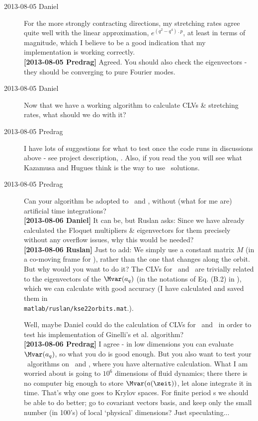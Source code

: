 \begin{description}
\item[2013-08-05 Daniel]
For the more strongly contracting directions, my stretching rates agree
quite well with the linear approximation, $e^{(q^2-q^4)\period{p}}$, at least
in terms of magnitude, which I believe to be a good indication that my
implementation is working correctly.
\\
{\bf [2013-08-05 Predrag]} Agreed. You should also check the eigenvectors - they
should be converging to pure Fourier modes.

\item[2013-08-05 Daniel]
Now that we have a working algorithm to calculate CLVs \& stretching
rates, what should we do with it?

\item[2013-08-05 Predrag] I have lots of suggestions for what to test
once the code runs in discussions above - see project description,
. Also, if you read the  you will
see what Kazamusa and Hugues think is the way to use \po\ solutions.

\item[2013-08-05 Predrag] Can your algorithm be adopted to
\eqva\ and \reqva, without (what for me are) artificial time integrations?
\\
{\bf [2013-08-06 Daniel]} It can be, but Ruslan asks: Since we have
already calculated the Floquet multipliers \& eigenvectors for them
precisely without any overflow issues, why this would be needed?
\\
{\bf [2013-08-06 Ruslan]} Just to add: We simply use a constant matrix
$M$ (in a co-moving frame for \reqva), rather than the one that changes
along the orbit.  But why would you want to do it?  The CLVs for \eqva\
and \reqva\ are trivially related to the eigenvectors of the {\stabmat}
$\Mvar(\ssp_q)$ (in the notations of Eq. (B.2) in \refref{SCD07}), which
we can calculate with good accuracy (I have calculated and saved them
in\\ \texttt{matlab/ruslan/kse22orbits.mat}.).

Well, maybe Daniel
could do the calculation of CLVs for \eqva\ and \reqva\ in order to test
his implementation of Ginelli's et al. algorithm?
\\
{\bf [2013-08-06 Predrag]} I agree - in low dimensions you can evaluate
{\stabmat} $\Mvar(\ssp_q)$, so what you do is good enough. But you also want to
test your \po\ algorithms on \eqva\ and \reqva, where you have alternative
calculation. What I am worried about is going to $10^6$ dimensions of
fluid dynamics; there there is no computer big enough to store
$\Mvar(\ssp(\zeit))$, let alone integrate it in time. That's why one goes to
Krylov spaces. For finite period \po s we should be able to do better; go to
covariant vectors basis, and keep only the small number (in 100's) of
local `physical' dimensions? Just speculating...


\end{description}
